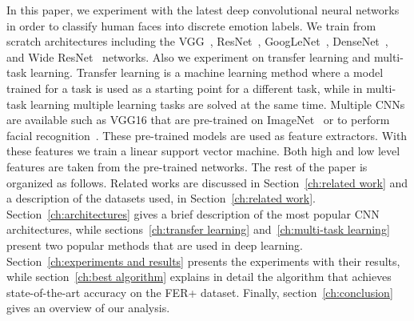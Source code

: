 In this paper, we experiment with the latest deep convolutional neural networks in order to classify human faces into discrete emotion labels. We train from scratch architectures including the VGG~\cite{simonyan2014very}, ResNet~\cite{he2016deep}, GoogLeNet~\cite{szegedy2015going}, DenseNet~\cite{huang2017densely}, and Wide ResNet~\cite{zagoruyko2016wide} networks. Also we experiment on transfer learning and multi-task learning. Transfer learning is a machine learning method where a model trained for a task is used as a starting point for a different task, while in multi-task learning multiple learning tasks are solved at the same time. Multiple CNNs are available such as VGG16 that are pre-trained on ImageNet~\cite{deng2009imagenet} or to perform facial recognition~\cite{parkhi2015deep}. These pre-trained models are used as feature extractors. With these features we train a linear support vector machine. Both high and low level features are taken from the pre-trained networks.
The rest of the paper is organized as follows. Related works are discussed in Section~\ref{ch:related work} and a description of the datasets used, in Section~\ref{ch:related work}. Section~\ref{ch:architectures} gives a brief description of the most popular CNN architectures, while sections~\ref{ch:transfer learning} and~\ref{ch:multi-task learning} present two popular methods that are used in deep learning. Section~\ref{ch:experiments and results} presents the experiments with their results, while section~\ref{ch:best algorithm} explains in detail the algorithm that achieves state-of-the-art accuracy on the FER+ dataset. Finally, section~\ref{ch:conclusion} gives an overview of our analysis.

